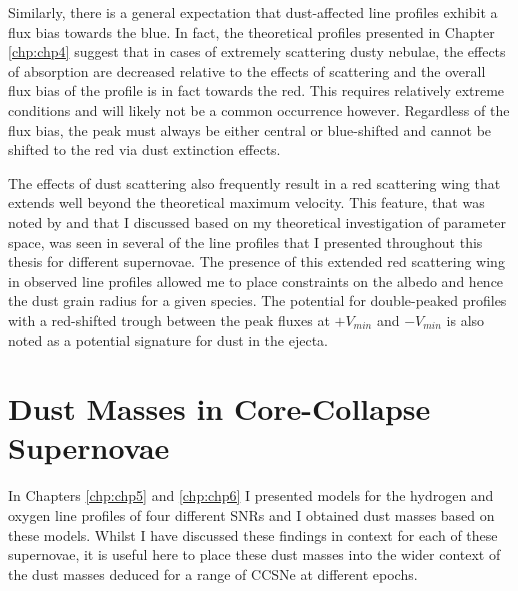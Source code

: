 Similarly, there is a general expectation that dust-affected line profiles exhibit a flux bias towards the blue.  In fact, the theoretical profiles presented in Chapter \ref{chp:chp4} suggest that in cases of extremely scattering dusty nebulae, the effects of absorption are decreased relative to the effects of scattering and the overall flux bias of the profile is in fact towards the red.  This requires relatively extreme conditions and will likely not be a common occurrence however.   Regardless of the flux bias, the peak must always be either central or blue-shifted and cannot be shifted to the red via dust extinction effects.  

The effects of dust scattering also frequently result in a red scattering wing that extends well beyond the theoretical maximum velocity.  This feature, that was noted by \citet{Lucy1989} and that I discussed based on my theoretical investigation of parameter space, was seen in several of the line profiles that I presented throughout this thesis for different supernovae.  The presence of this extended red scattering wing in observed line profiles allowed me to place constraints on the albedo and hence the dust grain radius for a given species.  The potential for double-peaked profiles with a red-shifted trough between the peak fluxes at $+V_{min}$ and $-V_{min}$ is also noted as a potential signature for dust in the ejecta.

\section{Dust Masses in Core-Collapse Supernovae}

In Chapters \ref{chp:chp5} and \ref{chp:chp6} I presented models for the hydrogen and oxygen line profiles of four different SNRs and I obtained dust masses based on these models.  Whilst I have discussed these findings in context for each of these supernovae, it is useful here to place these dust masses into the wider context of the dust masses deduced for a range of CCSNe at different epochs.  

